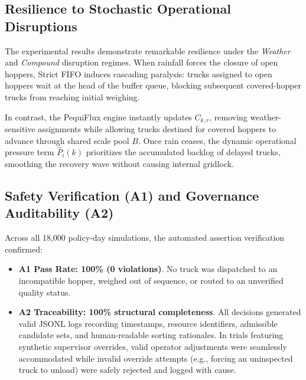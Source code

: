 \documentclass[12pt,a4paper]{article}
\begin{document}
\subsection{Resilience to Stochastic Operational Disruptions}
The experimental results demonstrate remarkable resilience under the \emph{Weather} and \emph{Compound} disruption regimes. When rainfall forces the closure of open hoppers, Strict FIFO induces cascading paralysis: trucks assigned to open hoppers wait at the head of the buffer queue, blocking subsequent covered-hopper trucks from reaching initial weighing. 

In contrast, the PequiFlux engine instantly updates $C_{k,r}$, removing weather-sensitive assignments while allowing trucks destined for covered hoppers to advance through shared scale pool $B$. Once rain ceases, the dynamic operational pressure term $\hat{P}_i(k)$ prioritizes the accumulated backlog of delayed trucks, smoothing the recovery wave without causing internal gridlock.

\subsection{Safety Verification (A1) and Governance Auditability (A2)}
Across all 18,000 policy-day simulations, the automated assertion verification confirmed:
\begin{itemize}[leftmargin=1.2cm,itemsep=0pt,topsep=2pt]
  \item \textbf{A1 Pass Rate: 100\% (0 violations)}. No truck was dispatched to an incompatible hopper, weighed out of sequence, or routed to an unverified quality status.
  \item \textbf{A2 Traceability: 100\% structural completeness}. All decisions generated valid JSONL logs recording timestamps, resource identifiers, admissible candidate sets, and human-readable sorting rationales. In trials featuring synthetic supervisor overrides, valid operator adjustments were seamlessly accommodated while invalid override attempts (e.g., forcing an uninspected truck to unload) were safely rejected and logged with cause.
\end{itemize}
\end{document}
